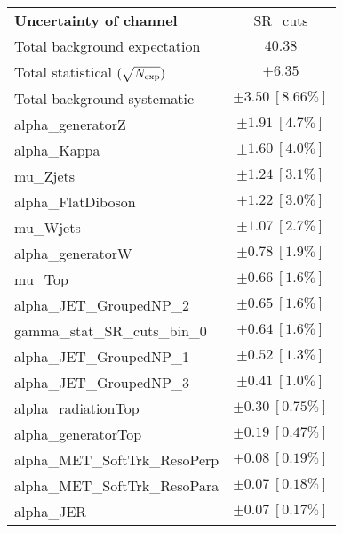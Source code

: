 
\begin{table}
\begin{center}
\setlength{\tabcolsep}{0.0pc}
\begin{tabular*}{\textwidth}{@{\extracolsep{\fill}}lc}
\noalign{\smallskip}\hline\noalign{\smallskip}
{\bf Uncertainty of channel}                                    & SR\_cuts            \\
\noalign{\smallskip}\hline\noalign{\smallskip}
Total background expectation             &  $40.38$       \\
\noalign{\smallskip}\hline\noalign{\smallskip}
Total statistical $(\sqrt{N_{\rm exp}})$              & $\pm 6.35$       \\
Total background systematic               & $\pm 3.50\ [8.66\%] $             \\
\noalign{\smallskip}\hline\noalign{\smallskip}
\noalign{\smallskip}\hline\noalign{\smallskip}
alpha\_generatorZ         & $\pm 1.91\ [4.7\%] $       \\
alpha\_Kappa         & $\pm 1.60\ [4.0\%] $       \\
mu\_Zjets         & $\pm 1.24\ [3.1\%] $       \\
alpha\_FlatDiboson         & $\pm 1.22\ [3.0\%] $       \\
mu\_Wjets         & $\pm 1.07\ [2.7\%] $       \\
alpha\_generatorW         & $\pm 0.78\ [1.9\%] $       \\
mu\_Top         & $\pm 0.66\ [1.6\%] $       \\
alpha\_JET\_GroupedNP\_2         & $\pm 0.65\ [1.6\%] $       \\
gamma\_stat\_SR\_cuts\_bin\_0         & $\pm 0.64\ [1.6\%] $       \\
alpha\_JET\_GroupedNP\_1         & $\pm 0.52\ [1.3\%] $       \\
alpha\_JET\_GroupedNP\_3         & $\pm 0.41\ [1.0\%] $       \\
alpha\_radiationTop         & $\pm 0.30\ [0.75\%] $       \\
alpha\_generatorTop         & $\pm 0.19\ [0.47\%] $       \\
alpha\_MET\_SoftTrk\_ResoPerp         & $\pm 0.08\ [0.19\%] $       \\
alpha\_MET\_SoftTrk\_ResoPara         & $\pm 0.07\ [0.18\%] $       \\
alpha\_JER         & $\pm 0.07\ [0.17\%] $       \\

\end{tabular*}
\end{center}
\end{table}
